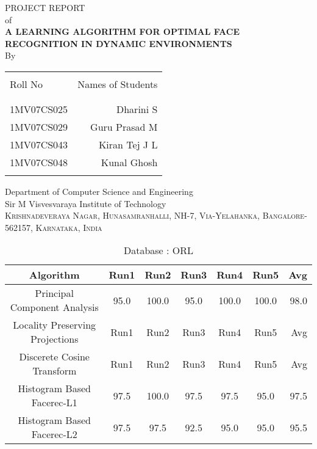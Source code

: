 \documentclass[10pt,a4paper]{article}
\begin{document}
\begin{center}

\textup{\Large PROJECT REPORT }\\[0.5cm]
\textup{\Large of }\\[0.5cm]


\uppercase{\Large \textbf {A Learning Algorithm for Optimal Face Recognition in Dynamic Environments}}\\[3.0cm]

\vspace{1.0cm}
\normalsize By \\
\begin{table}[h]
\centering
\begin{tabular}{lr}\hline \\
Roll No & Names of Students \\ \\ \hline
\\
1MV07CS025 & Dharini S \\
1MV07CS029 & Guru Prasad M \\
1MV07CS043 & Kiran Tej J L \\
1MV07CS048 & Kunal Ghosh \\ \\ \hline 
\end{tabular}
\end{table}

\vfill

\normalsize

\Large{Department of Computer Science and Engineering}\\
\LARGE{Sir M Visvesvaraya Institute of Technology }\\
\normalsize
\textsc{Krishnadeveraya Nagar, Hunasamranhalli, NH-7,
Via-Yelahanka, Bangalore-562157, Karnataka, India}\\

\vspace{0.5cm}

\newpage

\begin{table}
\caption{Database : ORL}
\centering
\begin{tabular}{| c | c | c | c | c | c | r | } \hline 
Algorithm & Run1 & Run2 & Run3 & Run4 & Run5 & Avg  \\  
\hline
Principal Component Analysis & 95.0 & 100.0 & 95.0 & 100.0 & 100.0 & 98.0 \\
\hline
Locality Preserving Projections & Run1 & Run2 & Run3 & Run4 & Run5 & Avg \\
\hline
Discerete Cosine Transform & Run1 & Run2 & Run3 & Run4 & Run5 & Avg \\
\hline
Histogram Based Facerec-L1 & 97.5 & 100.0 & 97.5 & 97.5 & 95.0 & 97.5 \\
\hline
Histogram Based Facerec-L2 & 97.5 & 97.5 & 92.5 & 95.0 & 95.0 & 95.5 \\
\hline
\end{tabular}
\end{table}



\end{center}
\end{document}
